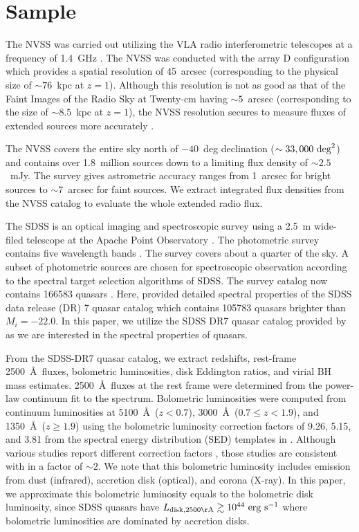\documentclass[preprint2,twocolappendix]{aastex6}
\begin{document}
\section{Sample}
\label{sec:sample}

The NVSS was carried out utilizing the VLA radio interferometric telescopes at a frequency of 1.4~GHz \citep{con98}. The NVSS was conducted with the array D configuration which provides a spatial resolution of 45~arcsec (corresponding to the physical size of $\sim76$~kpc at $z=1$). Although this resolution is not as good as that of the Faint Images of the Radio Sky at Twenty-cm \citep[FIRST;][]{bec95} having $\sim5$~arcsec (corresponding to the size of $\sim8.5$~kpc at $z=1$), the NVSS resolution secures to measure fluxes of extended sources more accurately \citep{lu07}. 

The NVSS covers the entire sky north of $-40$~deg declination ($\sim33,000~{\rm deg}^2$) and contains over 1.8~million sources down to a limiting flux density of $\sim2.5$~mJy. The survey gives astrometric accuracy ranges from 1~arcsec for bright sources to $\sim$7~arcsec for faint sources. We extract integrated flux densities from the NVSS catalog to evaluate the whole extended radio flux.

The SDSS is an optical imaging and spectroscopic survey \citep[e.g.,][]{yor00} using a 2.5~m wide-filed telescope at the Apache Point Observatory \citep{gun06}. The photometric survey contains five wavelength bands \citep[{\it ugriz};][]{fuk96}. The survey covers about a quarter of the sky. A subset of photometric sources are chosen for spectroscopic observation according to the spectral target selection algorithms of SDSS. The survey catalog now contains 166583  quasars \citep{par14}. Here, \citet{she11} provided detailed spectral properties of the SDSS data release (DR) 7 quasar catalog \citep{sch10} which contains 105783 quasars brighter than $M_i=-22.0$. In this paper, we utilize the SDSS DR7 quasar catalog provided by \citet{she11} as we are interested in the spectral properties of quasars. 

From the SDSS-DR7 quasar catalog, we extract redshifts, rest-frame 2500~\AA~fluxes, bolometric luminosities, disk Eddington ratios, and virial BH mass estimates. 2500~\AA~fluxes at the rest frame were determined from the power-law continuum fit to the spectrum. Bolometric luminosities were computed from continuum luminosities at 5100~\AA~($z<0.7$), 3000~\AA~($0.7\le z<1.9$), and 1350~\AA~($z\ge1.9$) using the bolometric luminosity correction factors of 9.26, 5.15, and 3.81 from the spectral energy distribution (SED) templates in \citet{ric06}. Although various studies report different correction factors \citep[see e.g.][]{elv94,ric06,nem10,run12,kra13}, those studies are consistent with in a factor of $\sim2$. We note that this bolometric luminosity includes emission from dust (infrared), accretion disk (optical), and corona (X-ray). In this paper, we approximate this bolometric luminosity equals to the bolometric disk luminosity, since SDSS quasars have $L_{\rm disk, 2500\AA}\gtrsim10^{44}~{\rm erg~s^{-1}}$ where bolometric luminosities are dominated by accretion disks. 
\end{document}
